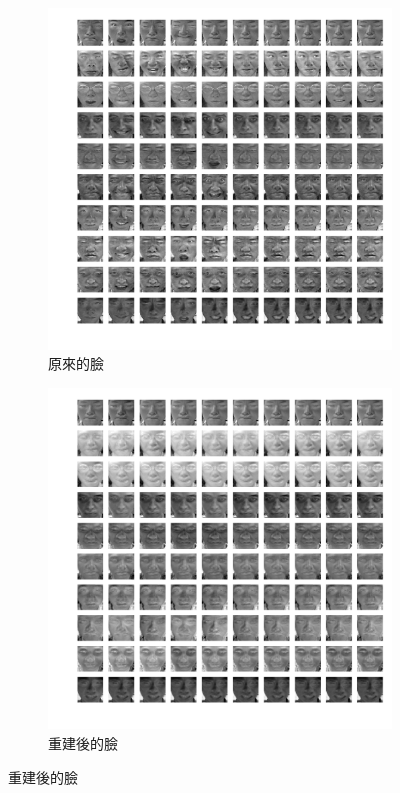\documentclass[fleqn,a4paper,12pt]{article}
\begin{document}
\begin{figure}[H]
\centering
\begin{subfigure}{.5\textwidth}
  \centering
  \includegraphics[width=\linewidth]{problem1/orig-faces.png}
  \caption{原來的臉}
  \label{fig:sub1}
\end{subfigure}%
\begin{subfigure}{.5\textwidth}
  \centering
  \includegraphics[width=\linewidth]{problem1/projected-faces.png}
  \caption{重建後的臉}
  \label{fig:sub2}
\end{subfigure}
\label{fig:p1.1}
\end{figure}
\end{document}
